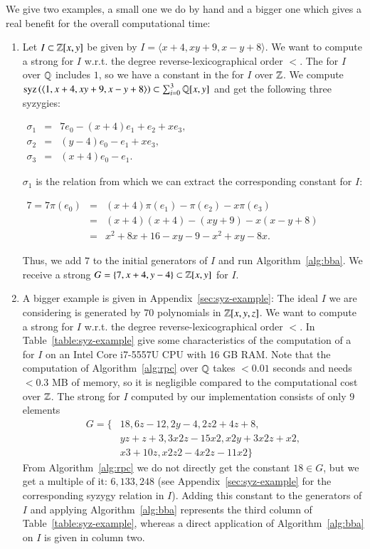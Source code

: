 \begin{example}
We give two examples, a small one we do by hand and a bigger one which gives a
real benefit for the overall computational time:
\begin{enumerate}
\item Let $I \subset \mathbb{Z}[x,y]$ be given by $I=\langle x+4, xy+9, x-y+8\rangle$.
We want to compute a strong \stb for $I$ w.r.t. the degree reverse-lexicographical
order $<$. The \stb for $I$ over $\mathbb{Q}$ includes $1$, so we have a constant in the
\stb for $I$ over $\mathbb{Z}$. We compute $\mathrm{syz}\left({\langle 1, x+4, xy+9, x-y+8\rangle}\right)
\subset \sum_{i=0}^3 \mathbb{Q}[x,y]$ and get the following three syzygies:
\begin{center}
$
\begin{array}{rcl}
\sigma_1 & = & 7 e_0 - (x+4) e_1 + e_2 + x e_3,\\
\sigma_2 & = & (y-4) e_0 - e_1 + x e_3,\\
\sigma_3 & = & (x+4) e_0 - e_1.
\end{array}
$
\end{center}
$\sigma_1$ is the relation from which we can extract the corresponding constant
for $I$:
\begin{center}
$
\begin{array}{rcl}
7 = 7 \pi(e_0) &=& (x+4) \pi(e_1) - \pi(e_2) - x \pi(e_3)\\
  &=& (x+4)(x+4) - (xy+9) - x(x-y+8)\\
  &=& x^2+8x+16 - xy -9 - x^2 + xy -8x.
\end{array}
$
\end{center}
Thus, we add $7$ to the initial generators of $I$ and run
Algorithm~\ref{alg:bba}. We receive a strong \stb $G = \{7, x+4, y-4\} \subset
\mathbb{Z}[x,y]$ for $I$.
\item A bigger example is given in Appendix~\ref{sec:syz-example}: The ideal $I$
we are considering is generated by $70$ polynomials in $\mathbb{Z}[x,y,z]$. We want to
compute a strong \stb for $I$ w.r.t. the degree reverse-lexicographical order $<$.
In Table~\ref{table:syz-example} give some characteristics of the computation
of a \stb for $I$ on an Intel Core
i7-5557U CPU with 16 GB RAM. Note that the computation of
Algorithm~\ref{alg:rpc} over $\mathbb{Q}$ takes $<0.01$ seconds and needs $<0.3$ MB of
memory, so it is
negligible compared to the computational cost over $\mathbb{Z}$. The strong \stb for $I$ computed by
our implementation consists of only $9$ elements
\begin{align*}
G = \{&18, 6z-12, 2y-4, 2z2+4z+8,\\
     &yz+z+3, 3x2z-15x2, x2y+3x2z+x2,\\
     &x3+10z, x2z2-4x2z-11x2\}
\end{align*}
From Algorithm~\ref{alg:rpc} we do not directly get the constant $18 \in G$, but
we get a multiple of it: $6,133,248$ (see Appendix~\ref{sec:syz-example} for the
    corresponding syzygy relation in $I$). Adding this constant to the generators of
$I$ and applying Algorithm~\ref{alg:bba} represents the third column of
Table~\ref{table:syz-example}, whereas a direct application of
Algorithm~\ref{alg:bba} on $I$ is given in column two.
\end{enumerate}
\end{example}

